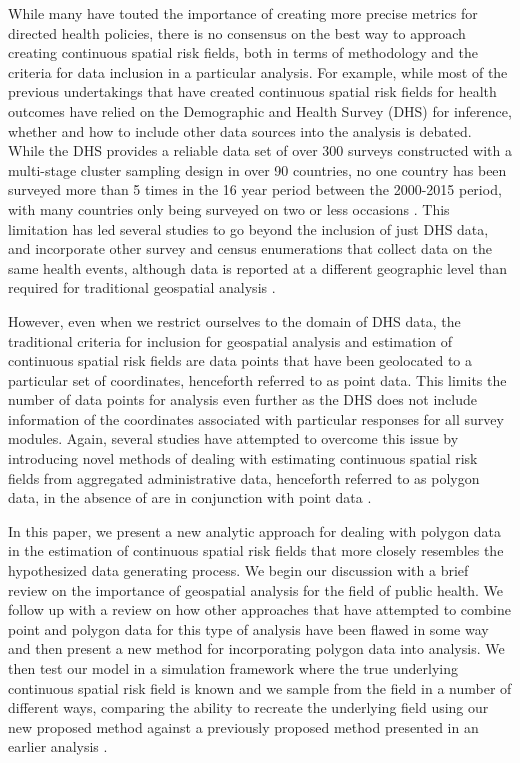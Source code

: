 \documentclass{article}
\begin{document}
While many have touted the importance of creating more precise metrics for directed health policies\cite{Bhutta2016, Desmond-Hellmann2016}, there is no consensus on the best way to approach creating continuous spatial risk fields, both in terms of methodology and the criteria for data inclusion in a particular analysis. For example, while most of the previous undertakings that have created continuous spatial risk fields for health outcomes have relied on the Demographic and Health Survey (DHS) for inference, whether and how to include other data sources into the analysis is debated. While the DHS provides a reliable data set of over 300 surveys constructed with a multi-stage cluster sampling design in over 90 countries, no one country has been surveyed more than 5 times in the 16 year period between the 2000-2015 period, with many countries only being surveyed on two or less occasions \cite{Burgert-Brucker2016, Gething2015}. This limitation has led several studies to go beyond the inclusion of just DHS data, and incorporate other survey and census enumerations that collect data on the same health events, although data is reported at a different geographic level than required for traditional geospatial analysis \cite{Golding2017, Reiner2018}.

However, even when we restrict ourselves to the domain of DHS data, the traditional criteria for inclusion for geospatial analysis and estimation of continuous spatial risk fields are data points that have been geolocated to a particular set of coordinates, henceforth referred to as point data. This limits the number of data points for analysis even further as the DHS does not include information of the coordinates associated with particular responses for all survey modules. Again, several studies have attempted to overcome this issue by introducing novel methods of dealing with estimating continuous spatial risk fields from aggregated administrative data, henceforth referred to as polygon data, in the absence of are in conjunction with point data \cite{Golding2017, Reiner2018, Utazi2018a}. 

In this paper, we present a new analytic approach for dealing with polygon data in the estimation of continuous spatial risk fields that more closely resembles the hypothesized data generating process. We begin our discussion with a brief review on the importance of geospatial analysis for the field of public health. We follow up with a review on how other approaches that have attempted to combine point and polygon data for this type of analysis have been flawed in some way and then present a new method for incorporating polygon data into analysis. We then test our model in a simulation framework where the true underlying continuous spatial risk field is known and we sample from the field in a number of different ways, comparing the ability to recreate the underlying field using our new proposed method against a previously proposed method presented in an earlier analysis \cite{Utazi2018a}.
\end{document}
